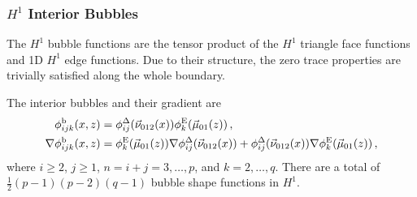 

\subsubsection{\texorpdfstring{$H^1$}{H1} Interior Bubbles} 
The $H^1$ bubble functions are the tensor product of the $H^1$ triangle face functions and 1D $H^1$ edge functions.
Due to their structure, the zero trace properties are trivially satisfied along the whole boundary.

The interior bubbles and their gradient are
\begin{equation}
	\begin{aligned}	
		\phi_{ijk}^\mathrm{b}(x,z)&=\phi_{ij}^\Delta(\vec{\nu}_{012}(x))\phi_k^{\mathrm{E}}(\vec{\mu}_{01}(z))\,,\\
		\nabla\phi_{ijk}^\mathrm{b}(x,z)&=\phi_k^{\mathrm{E}}(\vec{\mu}_{01}(z))\nabla\phi_{ij}^\Delta(\vec{\nu}_{012}(x))
			+\phi_{ij}^\Delta(\vec{\nu}_{012}(x))\nabla\phi_k^{\mathrm{E}}(\vec{\mu}_{01}(z))\,,
	\end{aligned}
\end{equation}
where $i\geq2$, $j\geq1$, $n=i+j=3,\ldots,p$, and $k=2,\ldots,q$. 
There are a total of $\frac{1}{2}(p-1)(p-2)(q-1)$ bubble shape functions in $H^1$.

